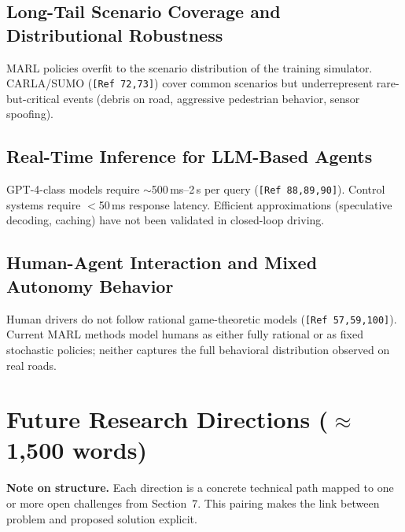 \documentclass[12pt, a4paper]{article}
\begin{document}
\subsection{Long-Tail Scenario Coverage and Distributional Robustness}

\begin{outline_note}
MARL policies overfit to the scenario distribution of the training
simulator.  CARLA/SUMO (\texttt{[Ref\,72,73]}) cover common scenarios
but underrepresent rare-but-critical events (debris on road, aggressive
pedestrian behavior, sensor spoofing).
\end{outline_note}

\subsection{Real-Time Inference for LLM-Based Agents}

\begin{outline_note}
GPT-4-class models require $\sim$500\,ms--2\,s per query
(\texttt{[Ref\,88,89,90]}).  Control systems require $<$50\,ms
response latency.  Efficient approximations (speculative decoding,
caching) have not been validated in closed-loop driving.
\end{outline_note}

\subsection{Human-Agent Interaction and Mixed Autonomy Behavior}

\begin{outline_note}
Human drivers do not follow rational game-theoretic models
(\texttt{[Ref\,57,59,100]}).  Current MARL methods model humans as
either fully rational or as fixed stochastic policies; neither
captures the full behavioral distribution observed on real roads.
\end{outline_note}

\section{Future Research Directions \textnormal{\small ($\approx$1{,}500 words)}}
\label{sec:future}

\begin{outline_note}
\textbf{Note on structure.}
Each direction is a concrete technical path mapped to one or more
open challenges from Section~7.  This pairing makes the link between
problem and proposed solution explicit.
\end{outline_note}
\end{document}
